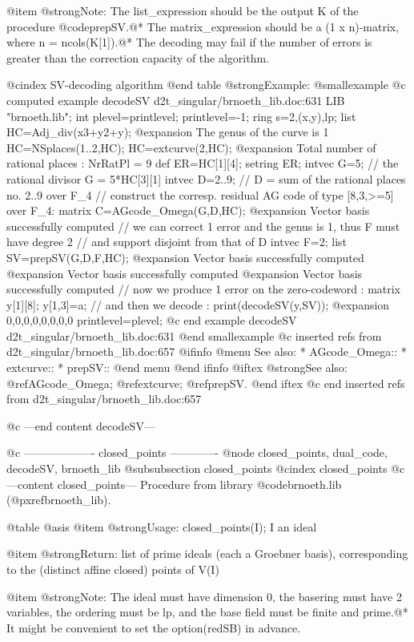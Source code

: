 @item @strong{Note:}
The list_expression should be the output K of the procedure
@code{prepSV}.@*
The matrix_expression should be a (1 x n)-matrix, where
n = ncols(K[1]).@*
The decoding may fail if the number of errors is greater than
the correction capacity of the algorithm.

@cindex SV-decoding algorithm
@end table
@strong{Example:}
@smallexample
@c computed example decodeSV d2t_singular/brnoeth_lib.doc:631 
LIB "brnoeth.lib";
int plevel=printlevel;
printlevel=-1;
ring s=2,(x,y),lp;
list HC=Adj_div(x3+y2+y);
@expansion{} The genus of the curve is 1
HC=NSplaces(1..2,HC);
HC=extcurve(2,HC);
@expansion{} Total number of rational places : NrRatPl = 9
def ER=HC[1][4];
setring ER;
intvec G=5;      // the rational divisor G = 5*HC[3][1]
intvec D=2..9;   // D = sum of the rational places no. 2..9 over F_4
// construct the corresp. residual AG code of type [8,3,>=5] over F_4:
matrix C=AGcode_Omega(G,D,HC);
@expansion{} Vector basis successfully computed 
// we can correct 1 error and the genus is 1, thus F must have degree 2
// and support disjoint from that of D
intvec F=2;
list SV=prepSV(G,D,F,HC);
@expansion{} Vector basis successfully computed 
@expansion{} Vector basis successfully computed 
@expansion{} Vector basis successfully computed 
// now we produce 1 error on the zero-codeword :
matrix y[1][8];
y[1,3]=a;
// and then we decode :
print(decodeSV(y,SV));
@expansion{} 0,0,0,0,0,0,0,0
printlevel=plevel;
@c end example decodeSV d2t_singular/brnoeth_lib.doc:631
@end smallexample
@c inserted refs from d2t_singular/brnoeth_lib.doc:657
@ifinfo
@menu
See also:
* AGcode_Omega::
* extcurve::
* prepSV::
@end menu
@end ifinfo
@iftex
@strong{See also:}
@ref{AGcode_Omega};
@ref{extcurve};
@ref{prepSV}.
@end iftex
@c end inserted refs from d2t_singular/brnoeth_lib.doc:657

@c ---end content decodeSV---

@c ------------------- closed_points -------------
@node closed_points, dual_code, decodeSV, brnoeth_lib
@subsubsection closed_points
@cindex closed_points
@c ---content closed_points---
Procedure from library @code{brnoeth.lib} (@pxref{brnoeth_lib}).

@table @asis
@item @strong{Usage:}
closed_points(I); I an ideal

@item @strong{Return:}
list of prime ideals (each a Groebner basis), corresponding to
the (distinct affine closed) points of V(I)

@item @strong{Note:}
The ideal must have dimension 0, the basering must have 2
variables, the ordering must be lp, and the base field must
be finite and prime.@*
It might be convenient to set the option(redSB) in advance.


